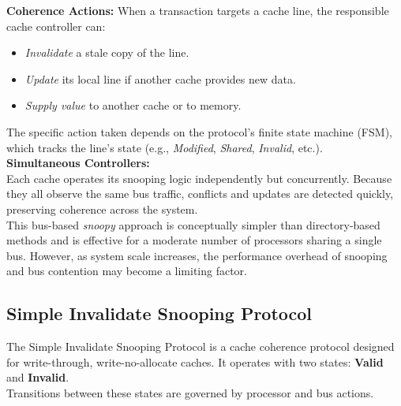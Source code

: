 \noindent \textbf{Coherence Actions:}
When a transaction targets a cache line, the responsible cache controller can:
\begin{itemize}
  \item \textit{Invalidate} a stale copy of the line.
  \item \textit{Update} its local line if another cache provides new data.
  \item \textit{Supply value} to another cache or to memory.
\end{itemize}
The specific action taken depends on the protocol’s finite state machine (FSM), which tracks the line’s state (e.g., \textit{Modified}, \textit{Shared}, \textit{Invalid}, etc.). \\
\smallskip
\noindent \textbf{Simultaneous Controllers:} \\
Each cache operates its snooping logic independently but concurrently. Because they all observe the same bus traffic, conflicts and updates are detected quickly, preserving coherence across the system. \\

This bus-based \emph{snoopy} approach is conceptually simpler than directory-based methods and is effective for a moderate number of processors sharing a single bus. However, as system scale increases, the performance overhead of snooping and bus contention may become a limiting factor.


\subsection{Simple Invalidate Snooping Protocol}
The Simple Invalidate Snooping Protocol is a cache coherence protocol designed for write-through, write-no-allocate caches. It operates with two states: \textbf{Valid} and \textbf{Invalid}. \\
Transitions between these states are governed by processor and bus actions.

